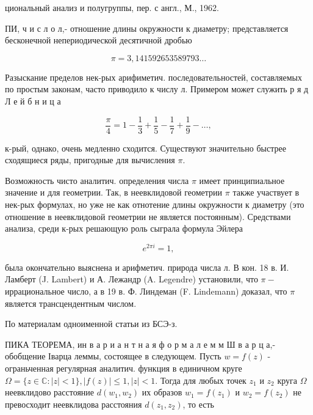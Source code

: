 \documentclass[10pt]{article}
\begin{document}
циональный анализ и полугруппы, пер. с англ., М., 1962.



ПИ, ч и с л о л,- отношение длины окружности к диаметру; представляется бесконечной непериодической десятичной дробью



\[

\pi=3,141592653589793 \ldots

\]



Разыскание пределов нек-рых арифиметич. последовательностей, составляемых по простым законам, часто приводило к числу л. Примером может служить р я д Л е й б н и ц а



\[

\frac{\pi}{4}=1-\frac{1}{3}+\frac{1}{5}-\frac{1}{7}+\frac{1}{9}-\ldots,

\]



к-рый, однако, очень медленно сходится. Существуют значительно быстрее сходящиеся ряды, пригодные для вычисления $\pi$.



Возможность чисто аналитич. определения числа $\pi$ имеет принципиальное значение и для геометрии. Так, в неевклидовой геометрии $\pi$ также участвует в нек-рых формулах, но уже не как отнотение длины окружности к диаметру (это отношение в неевклидовой геометрии не является постоянным). Средствами анализа, среди к-рых решающую роль сыграла формула Эйлера



\[

e^{2 \pi i}=1,

\]



была окончательно выяснена и арифметич. природа числа л. В кон. 18 в. И. Ламберт (J. Lambert) и А. Лежандр (A. Legendre) установили, что $\pi-$ иррациональное число, а в 19 в. Ф. Линдеман (F. Lindemann) доказал, что $\pi$ является трансцендентным числом.



По материалам одноименной статьи из БСЭ-з.



ПИКА ТЕОРЕМА, ин в а р и а н т н а я ф о р м а л е м м Ш в а р ц а,- обобщение Іварца леммы, состоящее в следующем. Пусть $w=f(z)$ - ограньченная регулярная аналитич. функция в единичном круге $\Omega=\{z \in \mathbb{C}:|z|<1\},|f(z)| \leqslant 1,|z|<1$. Тогда для любых точек $z_{1}$ и $z_{2}$ круга $\Omega$ неевклидово расстояние $d\left(w_{1}, w_{2}\right)$ их образов $w_{1}=f\left(z_{1}\right)$ и $w_{2}=f\left(z_{2}\right)$ не превосходит неевклидова расстояния $d\left(z_{1}, z_{2}\right)$, то есть
\end{document}
